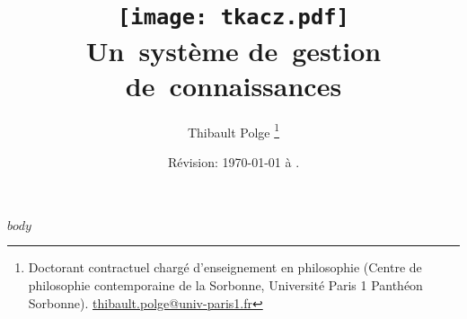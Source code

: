 \documentclass[11pt, french]{book} %
\begin{document}
\frontmatter

\title{%
\vspace{-3cm}
\texttt{[image: tkacz.pdf]}
\\
Un~système de~gestion de~connaissances
}
\author{Thibault Polge%
\thanks{Doctorant contractuel chargé d'enseignement en philosophie (Centre de philosophie contemporaine de la Sorbonne, Université Paris 1 Panthéon Sorbonne). \href{mailto:thibault.polge@univ-paris1.fr}{\mbox{thibault.polge@univ-paris1.fr}}
}
}

\date{Révision: \today{} à \currenttime.}
\date{}

\maketitle


$body$

\renewcommand*\listtablename{Tableaux et figures}
\listoftables

%

\tableofcontents
\end{document}
